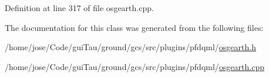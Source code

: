 Definition at line 317 of file osgearth.\-cpp.



The documentation for this class was generated from the following files\-:\begin{DoxyCompactItemize}
\item 
/home/jose/\-Code/gui\-Tau/ground/gcs/src/plugins/pfdqml/\hyperlink{osgearth_8h}{osgearth.\-h}\item 
/home/jose/\-Code/gui\-Tau/ground/gcs/src/plugins/pfdqml/\hyperlink{osgearth_8cpp}{osgearth.\-cpp}\end{DoxyCompactItemize}
